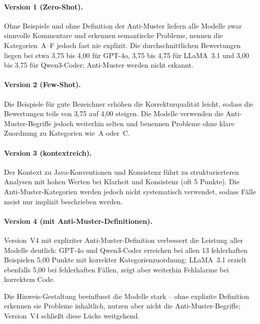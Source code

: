 \documentclass[a4paper,12pt]{article}
\begin{document}
\paragraph{Version 1 (Zero-Shot).}

Ohne Beispiele und ohne Definition der Anti-Muster liefern alle Modelle zwar sinnvolle Kommentare und erkennen semantische Probleme, nennen die Kategorien~A--F jedoch fast nie explizit. Die durchschnittlichen Bewertungen liegen bei etwa 3{,}75 bis 4{,}00 für GPT-4o, 3{,}75 bis 4{,}75 für LLaMA~3.1 und 3{,}00 bis 3{,}75 für Qwen3-Coder; Anti-Muster werden nicht erkannt.

\paragraph{Version 2 (Few-Shot).}

Die Beispiele für gute Bezeichner erhöhen die Korrekturqualität leicht, sodass die Bewertungen teils von 3{,}75 auf 4{,}00 steigen. Die Modelle verwenden die Anti-Muster-Begriffe jedoch weiterhin selten und benennen Probleme ohne klare Zuordnung zu Kategorien wie~A oder~C.%

\paragraph{Version 3 (kontextreich).}

Der Kontext zu Java-Konventionen und Konsistenz führt zu strukturierteren Analysen mit hohen Werten bei Klarheit und Konsistenz (oft 5 Punkte). Die Anti-Muster-Kategorien werden jedoch nicht systematisch verwendet, sodass Fälle meist nur implizit beschrieben werden.%

\paragraph{Version 4 (mit Anti-Muster-Definitionen).}

Version~V4 mit expliziter Anti-Muster-Definition verbessert die Leistung aller Modelle deutlich: GPT-4o und Qwen3-Coder erreichen bei allen 13 fehlerhaften Beispielen 5{,}00 Punkte mit korrekter Kategorienzuordnung; LLaMA~3.1 erzielt ebenfalls 5{,}00 bei fehlerhaften Fällen, zeigt aber weiterhin Fehlalarme bei korrektem Code.

Die Hinweis-Gestaltung beeinflusst die Modelle stark -- ohne explizite Definition erkennen sie Probleme inhaltlich, nutzen aber nicht die Anti-Muster-Begriffe; Version~V4 schließt diese Lücke weitgehend.
\end{document}
